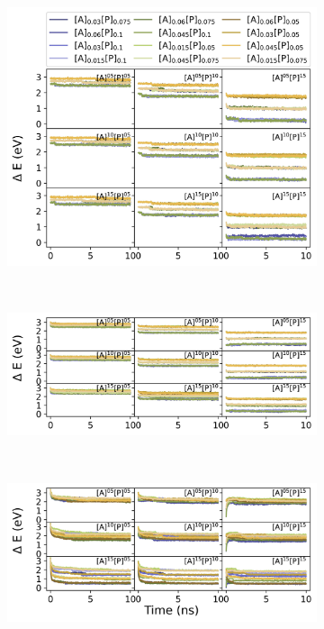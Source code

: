 \begin{figure}
\centering
\begin{subfigure}[b]{0.8\textwidth}
    \includegraphics[width=\textwidth]{figures/MD/Env/CS1_EDelta.jpeg}
\end{subfigure}\\
\begin{subfigure}[b]{0.8\textwidth}
    \includegraphics[width=\textwidth]{figures/MD/Env/CS2_EDelta.jpeg}
    \end{subfigure}\\
\begin{subfigure}[b]{0.8\textwidth}
    \includegraphics[width=\textwidth]{figures/MD/Env/CS3_EDelta.jpeg}

\end{subfigure}
\end{figure}
